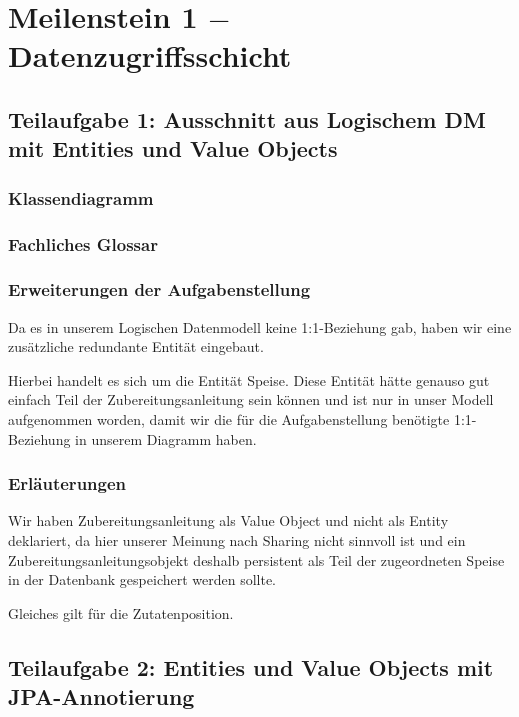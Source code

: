 \section{Meilenstein 1 $-$ Datenzugriffsschicht}

\subsection{Teilaufgabe 1: Ausschnitt aus Logischem DM mit Entities und Value Objects}

\subsubsection{Klassendiagramm}


\subsubsection{Fachliches Glossar}


\subsubsection{Erweiterungen der Aufgabenstellung}

Da es in unserem Logischen Datenmodell keine 1:1-Beziehung gab,
haben wir eine zus\"atzliche redundante Entit\"at eingebaut.

Hierbei handelt es sich um die Entit\"at Speise. Diese Entit\"at
h\"atte genauso gut einfach Teil der Zubereitungsanleitung sein
k\"onnen und ist nur in unser Modell aufgenommen worden, damit
wir die f\"ur die Aufgabenstellung ben\"otigte 1:1-Beziehung in
unserem Diagramm haben.

\subsubsection{Erl\"auterungen}

Wir haben Zubereitungsanleitung als Value Object und nicht als
Entity deklariert, da hier unserer Meinung nach Sharing nicht
sinnvoll ist und ein Zubereitungsanleitungsobjekt deshalb
persistent als Teil der zugeordneten Speise in der Datenbank
gespeichert werden sollte.

Gleiches gilt f\"ur die Zutatenposition.


\newpage

\subsection{Teilaufgabe 2: Entities und Value Objects mit JPA-Annotierung}

